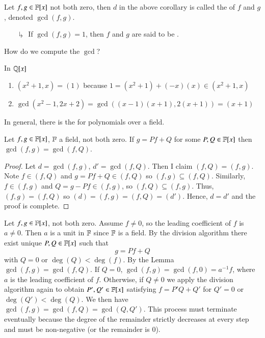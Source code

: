 \documentclass[12pt, a4paper, oneside, openright, titlepage]{book}
\begin{document}
\begin{defn}
    Let $f,g \in \mathbb F[x]$ not both zero, then $d$ in the above corollary is called the  of $f$ and $g$, denoted $\gcd(f,g)$.
    \begin{enumerate}
        \item[$\drsh$] If $\gcd(f,g) = 1$, then $f$ and $g$ are said to be . 
    \end{enumerate}
\end{defn}


\begin{qest}
    How do we compute the $\gcd$?
\end{qest}

\begin{eg}
    In $\mathbb Q[x]$
    \begin{enumerate}
        \item $(x^2+1,x) = (1)$ because $1 = (x^2+1) + (-x)(x) \in (x^2+1,x)$
        \item $\gcd(x^2-1,2x+2) = \gcd((x-1)(x+1),2(x+1)) = (x+1)$
    \end{enumerate}
\end{eg}


\begin{rmk}
    In general, there is the  for polynomials over a field.
\end{rmk}

\begin{lem}
    Let $f,g \in \mathbb F[x]$, $\mathbb F$ a field, not both zero. If $g = Pf + Q$ for some $P,Q \in \mathbb F[x]$ then $\gcd(f,g) = \gcd(f,Q)$.
\end{lem}
\begin{proof}
    Let $d = \gcd(f,g)$, $d' = \gcd(f,Q)$. Then I claim $(f,Q) = (f,g)$. Note $f \in (f,Q)$ and $g = Pf + Q \in (f,Q)$ so $(f,g) \subseteq (f,Q)$. Similarly, $f \in (f,g)$ and $Q = g - Pf \in (f,g)$, so $(f,Q) \subseteq (f,g)$. Thus, $(f,g) = (f,Q)$ so $(d) = (f,g) = (f,Q) = (d')$. Hence, $d = d'$ and the proof is complete.
\end{proof}

\begin{namthm}
    Let $f,g \in \mathbb F[x]$, not both zero. Assume $f \neq 0$, so the leading coefficient of $f$ is $a \neq 0$. Then $a$ is a unit in $\mathbb F$ since $\mathbb F$ is a field. By the division algorithm there exist unique $P, Q \in \mathbb F[x]$ such that \begin{equation}
        g = Pf + Q
    \end{equation}
    with $Q = 0$ or $\deg(Q) < \deg(f)$. By the Lemma $\gcd(f,g) = \gcd(f,Q)$. If $Q = 0$, $\gcd(f,g) = \gcd(f,0) = a^{-1}f$, where $a$ is the leading coefficient of $f$. Otherwise, if $Q \neq 0$ we apply the division algorithm again to obtain $P',Q' \in \mathbb F[x]$ satisfying $f = P'Q + Q'$ for $Q' = 0$ or $\deg(Q') < \deg(Q)$. We then have $\gcd(f,g) = \gcd(f,Q) = \gcd(Q, Q')$. This process must terminate eventually because the degree of the remainder strictly decreases at every step and must be non-negative (or the remainder is $0$).
\end{namthm}
\end{document}
